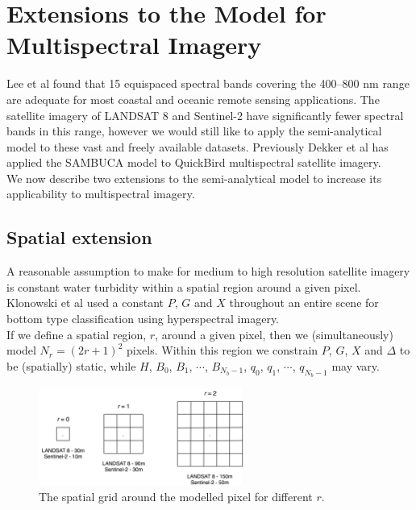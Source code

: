 \documentclass[12pt]{article}
\numberwithin{equation}{section}
\begin{document}
\section{Extensions to the Model for Multispectral Imagery}

Lee et al \cite{lee2002} found that 15 equispaced spectral bands covering the 
400--800 nm range are adequate for most coastal and oceanic remote sensing 
applications. The satellite imagery of LANDSAT 8 and Sentinel-2 have significantly 
fewer spectral bands in this range, however we would still like to apply the 
semi-analytical model to these vast and freely available datasets. Previously 
Dekker et al \cite{dekker2012} has applied the SAMBUCA \cite{wettle2006} model to 
QuickBird multispectral satellite imagery. \\

We now describe two extensions to the semi-analytical model to increase its applicability to 
multispectral imagery. 

	\subsection{Spatial extension}

A reasonable assumption to make for medium to high resolution satellite imagery is constant 
water turbidity within a spatial region around a given pixel. Klonowski et al \cite{klonowski2004} 
used a constant $P$, $G$ and $X$ throughout an entire scene for bottom type classification 
using hyperspectral imagery. \\

If we define a spatial region, $r$, around a given pixel, then we (simultaneously) model 
$N_r = (2r+1)^2$ pixels. Within this region we constrain $P$, $G$, $X$ and $\Delta$ to 
be (spatially) static, while $H$, $B_0$, $B_1$, $\cdots$, $B_{N_b-1}$, $q_0$, $q_1$, 
$\cdots$, $q_{N_b-1}$ may vary. 

\begin{figure}[H]
\centering
\includegraphics[width=0.6\textwidth]{spatial_constraint.png}
\caption{The spatial grid around the modelled pixel for different $r$.}
\end{figure}
\end{document}
